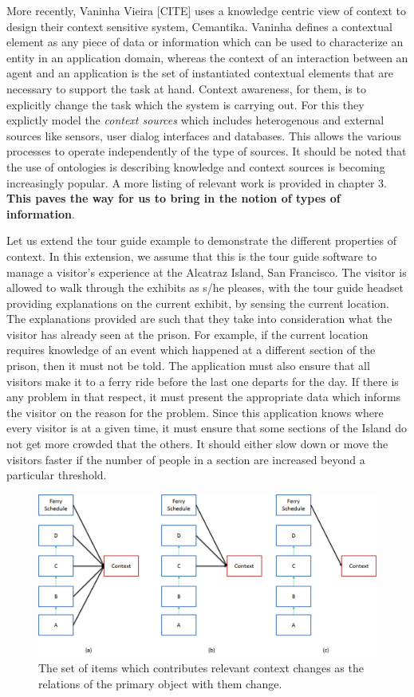 More recently, Vaninha Vieira [CITE] uses a knowledge centric view of context to design their context sensitive system, Cemantika. Vaninha defines a contextual element as any piece of data or information which can be used to characterize an entity in an application domain, whereas the context of an interaction between an agent and an application is the set of instantiated contextual elements that are necessary to support the task at hand. Context awareness, for them, is to explicitly change the task which the system is carrying out. For this they explictly model the \textit{context sources} which includes heterogenous and  external sources like sensors, user dialog interfaces and databases. This allows the various processes to operate independently of the type of sources. It should be noted that the use of ontologies is describing knowledge and context sources is becoming increasingly popular. A more listing of relevant work is provided in chapter 3. \textbf{This paves the way for us to bring in the notion of types of information}.

Let us extend the tour guide example to demonstrate the different properties of context. In this extension, we assume that this is the tour guide software to manage a visitor's experience at the Alcatraz Island, San Francisco. The visitor is allowed to walk through the exhibits as s/he pleases, with the tour guide headset providing explanations on the current exhibit, by sensing the current location. The explanations provided are such that they take into consideration what the visitor has already seen at the prison. For example, if the current location requires knowledge of an event which happened at a different section of the prison, then it must not be told. The application must also ensure that all visitors make it to a ferry ride before the last one departs for the day. If there is any problem in that respect, it must present the appropriate data which informs the visitor on the reason for the problem. Since this application knows where every visitor is at a given time, it must ensure that some sections of the Island do not get more crowded that the others. It should either slow down or move the visitors faster if the number of people in a section are increased beyond a particular threshold.

\begin{figure}[t]
\centering
\includegraphics[width=\textwidth]{media/chapter2/changes.png}
\caption{The set of items which contributes relevant context changes as the relations of the primary object with them change.}
\label{fig:turkey}
\end{figure}

